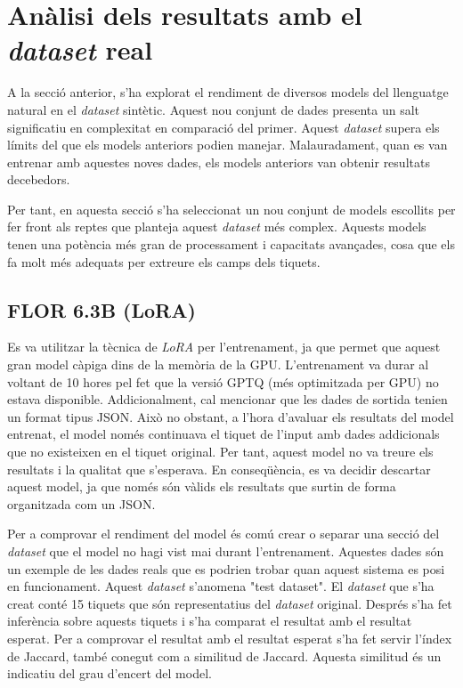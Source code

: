 \section{Anàlisi dels resultats amb el \textit{dataset} real}

A la secció anterior, s'ha explorat el rendiment de diversos models del llenguatge natural en el \textit{dataset} sintètic. Aquest nou conjunt de dades presenta un salt significatiu en complexitat en comparació del primer. Aquest \textit{dataset} supera els límits del que els models anteriors podien manejar. Malauradament, quan es van entrenar amb aquestes noves dades, els models anteriors van obtenir resultats decebedors.

Per tant, en aquesta secció s'ha seleccionat un nou conjunt de models escollits per fer front als reptes que planteja aquest \textit{dataset} més complex. Aquests models tenen una potència més gran de processament i capacitats avançades, cosa que els fa molt més adequats per extreure els camps dels tiquets.

\subsection{FLOR 6.3B (LoRA)}
Es va utilitzar la tècnica de \textit{LoRA} per l'entrenament, ja que permet que aquest gran model càpiga dins de la memòria de la GPU. L'entrenament va durar al voltant de 10 hores pel fet que la versió GPTQ (més optimitzada per GPU) no estava disponible. Addicionalment, cal mencionar que les dades de sortida tenien un format tipus JSON. Això no obstant, a l'hora d'avaluar els resultats del model entrenat, el model només continuava el tiquet de l'input amb dades addicionals que no existeixen en el tiquet original. Per tant, aquest model no va treure els resultats i la qualitat que s'esperava. En conseqüència, es va decidir descartar aquest model, ja que només són vàlids els resultats que surtin de forma organitzada com un JSON.

Per a comprovar el rendiment del model és comú crear o separar una secció del \textit{dataset} que el model no hagi vist mai durant l'entrenament. Aquestes dades són un exemple de les dades reals que es podrien trobar quan aquest sistema es posi en funcionament. Aquest \textit{dataset} s'anomena "test dataset". El \textit{dataset} que s'ha creat conté 15 tiquets que són representatius del \textit{dataset} original. Després s'ha fet inferència sobre aquests tiquets i s'ha comparat el resultat amb el resultat esperat. Per a comprovar el resultat amb el resultat esperat s'ha fet servir l'índex de Jaccard, també conegut com a similitud de Jaccard. Aquesta similitud és un indicatiu del grau d'encert del model.

